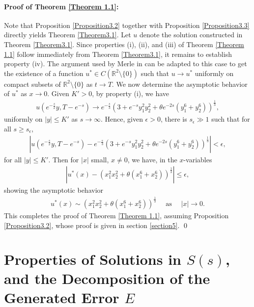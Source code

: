 \documentclass[11pt,reqno]{amsart}
\theoremstyle{definition}
\theoremstyle{bfremark}
\numberwithin{equation}{section}
\begin{document}
\vspace{10pt}

\paragraph{\textbf{Proof of Theorem \ref{Theorem 1.1}:}} Note that Proposition \ref{Proposition3.2} together with Proposition \ref{Proposition3.3} directly yields Theorem \ref{Theorem3.1}. Let \(u\)
denote the solution constructed in Theorem \ref{Theorem3.1}. Since properties (i), (ii), and (iii) of Theorem \ref{Theorem 1.1} follow immediately from Theorem \ref{Theorem3.1}, it remains to establish property (iv). The argument used by Merle in \cite{merle1992solution} can be adapted to this case to get the existence of a function \(u^*\in C(\mathbb{R}^2\setminus \{0\})\) such that \(u \to u^*\) uniformly on compact subsets of \(\mathbb{R}^2\setminus \{0\}\) as \(t \to T\). We now determine the asymptotic behavior of \(u^*\) as \(x \to 
0\). Given \(K'>0\), by property (i), we have
\begin{align*}
    u(e^{-\frac{s}{2}}y,T-e^{-s}) \to e^{-\frac{s}{3}}\left(3+e^{-s}y_1^2y_2^2+\theta e^{-2s}(y_1^6+y_2^6)\right
    )^{\frac{1}{3}},
\end{align*}
uniformly on \(|y| \leq K'\) as \(s \to \infty\). Hence, given \(\epsilon>0\), there is \(s_{\epsilon} \gg 1\) such that for all \(s \geq s_{\epsilon}\),
\begin{align*}
    \left|u(e^{-\frac{s}{2}}y,T-e^{-s})-e^{-\frac{s}{3}}\left(3+e^{-s}y_1^2y_2^2+\theta e^{-2s}(y_1^6+y_2^6)\right)^{\frac{1}{3}}\right|<\epsilon,
\end{align*}
for all \(|y| \leq K'\). Then for \(|x|\) small, \(x \neq 0\), we have, in the \(x\)-variables
\begin{align*}
    \left|u^{*}(x)-\left(x_1^2x_2^2+\theta(x_1^6+x_2^6)\right)^{\frac{1}{3}}\right| \leq \epsilon,
\end{align*}
showing the asymptotic behavior 
\begin{align*}
     u^{*}(x)\sim\left(x_1^2x_2^2+\theta(x_1^6+x_2^6)\right)^{\frac{1}{3}} \quad \text{ as } \quad |x|  \to  0. 
\end{align*}
This completes the proof of Theorem \ref{Theorem 1.1}, assuming Proposition \ref{Proposition3.2}, whose proof is given in section \ref{section5}. 
\qed

 \section{Properties of Solutions in \(S(s)\),  and the Decomposition of the Generated Error \(E\)}
 \label{section4}
 
\end{document}
